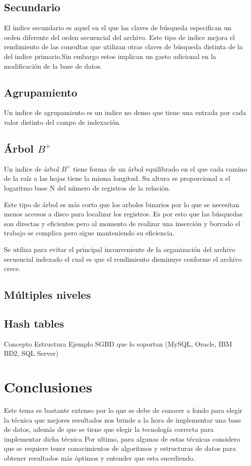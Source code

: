 \documentclass[12pt, titlepage]{article}
\begin{document}
	\subsection{Secundario}
	El índice secundario es aquel en el que las claves de búsqueda especifican un orden diferente del orden secuencial del archivo.
	Este tipo de indice mejora el rendimiento de las consultas que utilizan otras claves de búsqueda distinta de la del indice primario.Sin embargo estos implican un gasto adicional en la modificación de la base de datos.
	\subsection{Agrupamiento}
	Un indice de agrupamiento es un indice no denso que tiene una entrada por cada valor distinto del campo de indexación.
	\subsection{Árbol $B^{+}$}
	Un indice de árbol $B^{+}$ tiene forma de un árbol equilibrado en el que cada camino de la raíz a las hojas tiene la misma longitud. Su altura es proporcional a el logaritmo base N del número de registros de la relación.
	
	Este tipo de árbol es más corto que los arboles binarios por lo que se necesitan menos accesos a disco para localizar los registros. Es por esto que las búsquedas son directas y eficientes pero al momento de realizar una inserción y borrado el trabajo se complica pero sigue manteniendo su eficiencia.
	
	Se utiliza para evitar el principal inconveniente de la organización del archivo secuencial indexado el cual es que el rendimiento disminuye conforme el archivo crece.
	
	\subsection{Múltiples niveles}
	\subsection{Hash tables}
	
	Concepto
	Estructura
	Ejemplo
	SGBD que lo soportan (MySQL, Oracle, IBM BD2, SQL Server)
	\section{Conclusiones}
	Este tema es bastante extenso por lo que se debe de conocer a fondo para elegir la técnica que mejores resultados nos brinde a la hora de implementar una base de datos, además de que se tiene que elegir la tecnología correcta para implementar dicha técnica Por ultimo, para algunas de estas técnicas considero que se requiere tener conocimientos de algoritmos y estructuras de datos para obtener resultados más óptimos y entender que esta sucediendo.
	 
	
\end{document}
